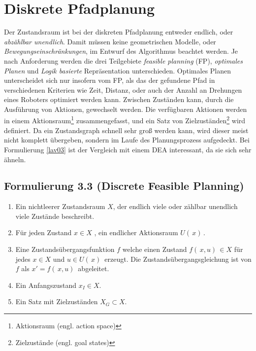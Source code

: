 \section{Diskrete Pfadplanung} \label{Kapitel 4.3} 
Der Zustandsraum ist bei der diskreten Pfadplanung entweder endlich, oder \textit{abzählbar unendlich}.
Damit müssen keine geometrischen Modelle, oder \textit{Bewegungseinschränkungen},  im Entwurf des Algorithmus beachtet werden.
Je nach Anforderung werden die drei Teilgebiete \textit{feasible planning} (FP), \textit{optimales Planen} und \textit{Logik basierte} Repräsentation unterschieden\cite[~S. 27]{Lav06}.
Optimales Planen unterscheidet sich nur insofern vom FP, als das der gefundene Pfad in verschiedenen Kriterien wie Zeit, Distanz, oder auch der Anzahl an Drehungen eines Roboters optimiert werden kann\cite[~S. 43]{Lav06}.
Zwischen Zuständen kann, durch die Ausführung von Aktionen, gewechselt werden. Die verfügbaren Aktionen werden in einem Aktionsraum\footnote{Aktionsraum (engl. action space) } zusammengefasst, und ein Satz von Zielzuständen\footnote{Zielzustände (engl. goal states)} wird definiert. 
Da ein Zustandsgraph schnell sehr groß werden kann, wird dieser meist nicht komplett übergeben, sondern im Laufe des Planungsprozess aufgedeckt\cite[~S. 43]{Lav06}. 
Bei Formulierung \ref{lav03} ist der Vergleich mit einem DEA interessant, da sie sich sehr ähneln\cite[~S. 233]{Schmitz:19}.

\subsection*{Formulierung 3.3 (Discrete Feasible Planning)\cite[~S. 29]{Lav06}}\label{lav03}
\begin{enumerate}
	\item Ein nichtleerer Zustandsraum $X$, der endlich viele oder zählbar unendlich viele Zustände beschreibt.  
	\item Für jeden Zustand $x \in X$ , ein endlicher Aktionsraum $U( \, x) \,$.
	\item Eine Zustandsübergangsfunktion $f$ welche einen Zustand  $f( \, x,u) \, \in X$ für jedes $x \in X$  und $u \in U( \, x) \,$ erzeugt. Die Zustandsübergangsgleichung ist von $f$ als $x' = f( \, x,u )\, $ abgeleitet.
	\item Ein Anfangszustand $ x_{I} \in X$.
	\item Ein Satz mit Zielzuständen $X_{G} \subset X$.
\end{enumerate}

